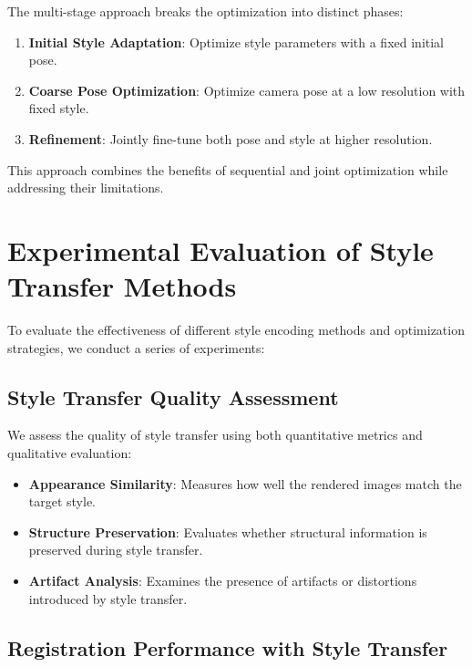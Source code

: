 The multi-stage approach breaks the optimization into distinct phases:

\begin{enumerate}
    \item \textbf{Initial Style Adaptation}: Optimize style parameters with a fixed initial pose.
    
    \item \textbf{Coarse Pose Optimization}: Optimize camera pose at a low resolution with fixed style.
    
    \item \textbf{Refinement}: Jointly fine-tune both pose and style at higher resolution.
\end{enumerate}

This approach combines the benefits of sequential and joint optimization while addressing their limitations.

\section{Experimental Evaluation of Style Transfer Methods}

To evaluate the effectiveness of different style encoding methods and optimization strategies, we conduct a series of experiments:

\subsection{Style Transfer Quality Assessment}

We assess the quality of style transfer using both quantitative metrics and qualitative evaluation:

\begin{itemize}
    \item \textbf{Appearance Similarity}: Measures how well the rendered images match the target style.
    
    \item \textbf{Structure Preservation}: Evaluates whether structural information is preserved during style transfer.
    
    \item \textbf{Artifact Analysis}: Examines the presence of artifacts or distortions introduced by style transfer.
\end{itemize}

\subsection{Registration Performance with Style Transfer}


